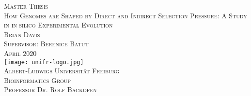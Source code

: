 \begin{titlepage}
\begin{center}
	\vspace{6em}
	{\huge \textsc{Master Thesis}}\\
	\vspace{3em}
	{\huge \textsc{How Genomes are Shaped by Direct and Indirect Selection Pressure: A Study in in silico Experimental Evolution}}\\
	\vspace{3em}
	{\Large \textsc{Brian Davis}}\\
	\vspace{2em}
	{\Large \textsc{Supervisor: Berenice Batut}}\\
	\vspace{3em}
	{\Large \textsc{April 2020}}\\
	\vspace{5em}
	\texttt{[image: unifr-logo.jpg]}\\
	\vspace{3em}
	{\Large \textsc{Albert-Ludwigs Universität Freiburg}}\\
	\vspace{2em}
	{\Large \textsc{Bioinformatics Group}}\\
	\vspace{2em}
	{\Large \textsc{Professor Dr. Rolf Backofen}}\\
\end{center}
\end{titlepage}
